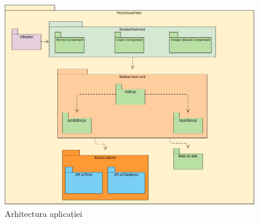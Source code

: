  \begin{figure}[!htbp]
    \begin{center}
        \includegraphics[width=1.0\textwidth]{images/arhitectura.png}
        \caption{Arhitectura aplicației}
    \end{center}
\end{figure}

